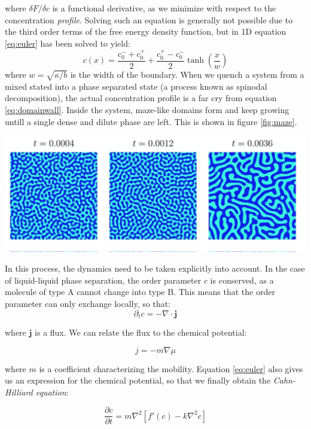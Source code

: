 \documentclass{Dissertate}
\let\origfigure\figure
\let\endorigfigure\endfigure
\renewenvironment{figure}[1][2] {
    \expandafter\origfigure\expandafter[H]
} {
    \endorigfigure
}
\begin{document}
where \(\delta F/\delta c\) is a functional derivative, as we minimize
with respect to the concentration \emph{profile}. Solving such an
equation is generally not possible due to the third order terms of the
free energy density function, but in 1D equation \ref{eq:euler} has
been solved to yield: \begin{equation}
c(x) = \frac{c_0^-+c_0^+}{2}+\frac{c_0^+-c_0^-}{2}\tanh\left(\frac{x}{w}\right)
\label{eq:domainwall}\end{equation} where \(w=\sqrt{\kappa/b}\) is the
width of the boundary. When we quench a system from a mixed stated into
a phase separated state (a process known as spinodal decomposition), the
actual concentration profile is a far cry from equation
\ref{eq:domainwall}. Inside the system, maze-like domains form and
keep growing untill a single dense and dilute phase are left. This is
shown in figure \ref{fig:maze}.

\begin{figure}
\hypertarget{fig:maze}{%
\centering
\includegraphics{source/figures/png/CahnHilliard.png}
\caption{Cahn hilliard domains}\label{fig:maze}
}
\end{figure}

In this process, the dynamics need to be taken explicitly into account.
In the case of liquid-liquid phase separation, the order parameter \(c\)
is conserved, as a molecule of type A cannot change into type B. This
means that the order parameter can only exchange locally, so that: \[
\partial_t c = -\nabla \cdot \mathbf{j}
\]

where \(\mathbf{j}\) is a flux. We can relate the flux to the chemical
potential:

\[
j = -m \nabla \mu
\]

where \(m\) is a coefficient characterizing the mobility. Equation
\ref{eq:euler} also gives us an expression for the chemical
potential, so that we finally obtain the \emph{Cahn-Hilliard equation}:

\[
\frac{\partial c}{\partial t}=m\nabla^2[f'(c)-k\nabla^2c]
\]
\end{document}
